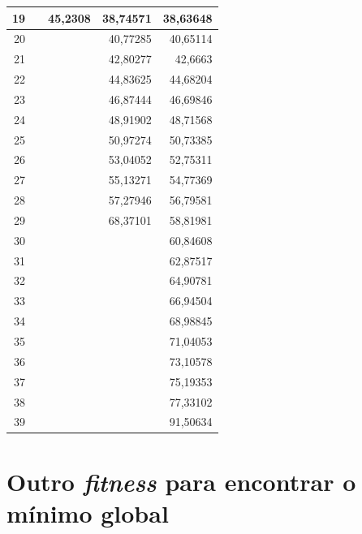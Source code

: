 \begin{table}[pt]
\begin{center}
\begin{tabular}{r|r|r|r|r}
					19 &            &    45,2308 &   38,74571 &   38,63648 \\
	\hline
					20 &            &            &   40,77285 &   40,65114 \\
	\hline
					21 &            &            &   42,80277 &    42,6663 \\
	\hline
					22 &            &            &   44,83625 &   44,68204 \\
	\hline
					23 &            &            &   46,87444 &   46,69846 \\
	\hline
					24 &            &            &   48,91902 &   48,71568 \\
	\hline
					25 &            &            &   50,97274 &   50,73385 \\
	\hline
					26 &            &            &   53,04052 &   52,75311 \\
	\hline
					27 &            &            &   55,13271 &   54,77369 \\
	\hline
					28 &            &            &   57,27946 &   56,79581 \\
	\hline
					29 &            &            &   68,37101 &   58,81981 \\
	\hline
					30 &            &            &            &   60,84608 \\
	\hline
					31 &            &            &            &   62,87517 \\
	\hline
					32 &            &            &            &   64,90781 \\
	\hline
					33 &            &            &            &   66,94504 \\
	\hline
					34 &            &            &            &   68,98845 \\
	\hline
					35 &            &            &            &   71,04053 \\
	\hline
					36 &            &            &            &   73,10578 \\
	\hline
					37 &            &            &            &   75,19353 \\
	\hline
					38 &            &            &            &   77,33102 \\
	\hline
					39 &            &            &            &   91,50634 \\
	\hline \hline
	\end{tabular}
	\end{center}  
\end{table}

\section{Outro \textit{fitness} para encontrar o mínimo global}

